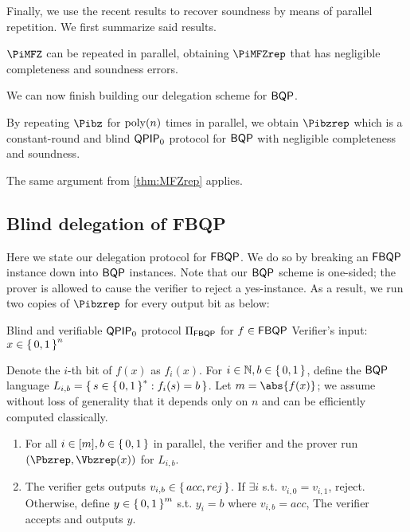 Finally, we use the recent results \cite{parallelrep, alagic2019twomessage} to recover soundness by means of parallel repetition.
We first summarize said results.

\begin{thm}
	\label{thm:MFZrep}
	$\PiMFZ$ can be repeated in parallel, obtaining $\PiMFZrep$ that has negligible completeness and soundness errors. 
\end{thm}


We can now finish building our delegation scheme for $\operatorname{\mathsf{BQP}}$.
\begin{thm}
	\label{thm:QPIP0BQP}
	By repeating $\Pibz$ for $\operatorname*{\operatorname{poly}}(n)$ times in parallel,
	we obtain $\Pibzrep$ which is a constant-round and blind $\operatorname{\mathsf{QPIP}}_0$ protocol for $\operatorname{\mathsf{BQP}}$ with negligible completeness and soundness.
\end{thm}
\begin{prf}
	The same argument from \cref{thm:MFZrep} applies.
\end{prf}

\subsection{Blind delegation of FBQP}
\label{subsec:BlindFBQP}

Here we state our delegation protocol for $\operatorname{\mathsf{FBQP}}$.
We do so by breaking an $\operatorname{\mathsf{FBQP}}$ instance down into $\operatorname{\mathsf{BQP}}$ instances.
Note that our $\operatorname{\mathsf{BQP}}$ scheme is one-sided; the prover is allowed to cause the verifier to reject a yes-instance. 
As a result, we run two copies of $\Pibzrep$ for every output bit as below:

\begin{protocol}{Blind and verifiable $\operatorname{\mathsf{QPIP}}_0$ protocol $\Pi_{\operatorname{\mathsf{FBQP}}}$ for $f\in\operatorname{\mathsf{FBQP}}$}
	\label{proto:QPIP0FBQP}
	Verifier's input: $x\in\set{0, 1}^n$

	Denote the $i$-th bit of $f(x)$ as $f_i(x)$.
	For $i\in\mathbb{N}, b\in\set{0,1}$, define the $\operatorname{\mathsf{BQP}}$ language $L_{i, b}=\set{s\in\set{0,1}^* : f_i(s)=b}$.
	Let $m=\abs{f(x)}$; we assume without loss of generality that it depends only on $n$ and can be efficiently computed classically.
	\begin{enumerate}
		\item For all $i\in[m], b\in\set{0, 1}$ in parallel, the verifier and the prover run $(\Pbzrep, \Vbzrep(x))$ for $L_{i, b}$.
		\item The verifier gets outputs $v_{i, b}\in\set{acc, rej}$.
			If $\exists i$ s.t. $v_{i,0}=v_{i,1}$, reject.
			Otherwise, define $y\in\set{0,1}^m$ s.t. $y_i = b$ where $v_{i, b}=acc$,
			The verifier accepts and outputs $y$.
	\end{enumerate}
\end{protocol}

